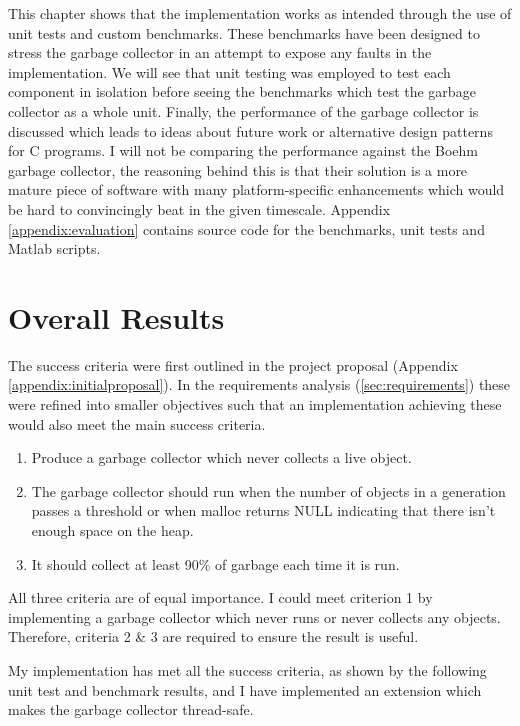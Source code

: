 \documentclass[../diss.tex]{subfiles}
\begin{document}
This chapter shows that the implementation works as intended through the use of unit tests and custom benchmarks. These benchmarks have been designed to stress the garbage collector in an attempt to expose any faults in the implementation. We will see that unit testing was employed to test each component in isolation before seeing the benchmarks which test the garbage collector as a whole unit. Finally, the performance of the garbage collector is discussed which leads to ideas about future work or alternative design patterns for C programs. I will not be comparing the performance against the Boehm garbage collector, the reasoning behind this is that their solution is a more mature piece of software with many platform-specific enhancements which would be hard to convincingly beat in the given timescale. Appendix \ref{appendix:evaluation} contains source code for the benchmarks, unit tests and Matlab scripts.

\section{Overall Results} \label{sec:overallresults}


The success criteria were first outlined in the project proposal (Appendix \ref{appendix:initialproposal}). In the requirements analysis (\cref{sec:requirements}) these were refined into smaller objectives such that an implementation achieving these would also meet the main success criteria.

\begin{enumerate}
    \item Produce a garbage collector which never collects a live object.
    \item The garbage collector should run when the number of objects in a generation passes a threshold or when malloc returns NULL indicating that there isn't enough space on the heap.
    \item  It should collect at least 90\% of garbage each time it is run.
\end{enumerate}
 
All three criteria are of equal importance. I could meet criterion 1 by implementing a garbage collector which never runs or never collects any objects. Therefore, criteria 2 \& 3 are required to ensure the result is useful.

My implementation has met all the success criteria, as shown by the following unit test and benchmark results, and I have implemented an extension which makes the garbage collector thread-safe.
\end{document}
